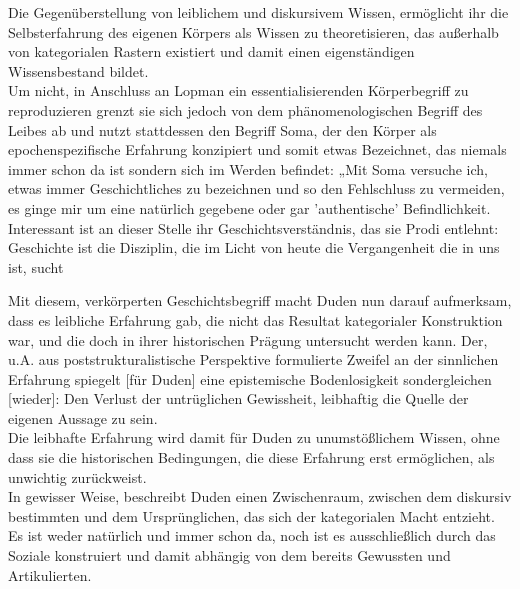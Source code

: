 Die Gegenüberstellung von leiblichem und diskursivem Wissen, ermöglicht ihr die
Selbsterfahrung des eigenen Körpers als Wissen zu theoretisieren, das außerhalb
von kategorialen Rastern existiert und damit einen eigenständigen
Wissensbestand bildet. \\
Um nicht, in Anschluss an Lopman ein essentialisierenden
Körperbegriff zu reproduzieren grenzt sie sich jedoch von dem
phänomenologischen Begriff des Leibes ab und nutzt stattdessen den Begriff
Soma, der den Körper als \glqq epochenspezifische Erfahrung \grqq \footnotemark
{} konzipiert und somit
etwas Bezeichnet, das niemals immer schon da ist sondern sich im Werden
befindet: „Mit Soma versuche ich, etwas immer Geschichtliches zu bezeichnen und
so den Fehlschluss zu vermeiden, es ginge mir um eine natürlich gegebene oder
gar 'authentische' Befindlichkeit. Interessant ist an dieser Stelle ihr
Geschichtsverständnis, das sie Prodi entlehnt: \glqq [...] Geschichte ist die
Disziplin, die im Licht von heute die Vergangenheit die in uns ist, sucht \grqq
\footnotemark {}

Mit diesem, verkörperten Geschichtsbegriff macht Duden nun darauf aufmerksam,
dass es \glqq leibliche Erfahrung gab, die nicht das Resultat kategorialer
Konstruktion war, und die doch in ihrer historischen Prägung untersucht werden
kann.\grqq \footnotemark {} Der, u.A. aus poststrukturalistische Perspektive formulierte Zweifel
\glqq an der sinnlichen Erfahrung spiegelt [für Duden] eine epistemische
Bodenlosigkeit sondergleichen [wieder]: Den Verlust der untrüglichen
Gewissheit, leibhaftig die Quelle der eigenen Aussage zu sein. \grqq
\footnotemark {} 
\\
Die leibhafte
Erfahrung wird damit für Duden zu unumstößlichem Wissen, ohne dass sie die
historischen Bedingungen, die diese Erfahrung erst ermöglichen, als unwichtig
zurückweist. \\
In gewisser Weise, beschreibt Duden einen Zwischenraum, zwischen
dem diskursiv bestimmten und dem Ursprünglichen, das sich der kategorialen
Macht entzieht. Es ist weder natürlich und immer schon da, noch ist es
ausschließlich durch das Soziale konstruiert und damit abhängig von dem bereits
Gewussten und Artikulierten. 
\\


